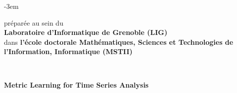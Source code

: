 \begin{titlepage}
\begin{adjustwidth}{}{-3em}
\begin{flushleft}
\vfill

\begin{flushright}
\begin{minipage}{\leftshift}
\begin{flushleft}
{préparée au sein du \\\textbf{Laboratoire d'Informatique de Grenoble (LIG)}\\
dans \textbf{l'école doctorale Mathématiques, Sciences et Technologies de l'Information, Informatique (MSTII)}}
\end{flushleft}
\end{minipage}
\end{flushright}~~\\[0.5cm]

\vfill

\begin{flushright}
\begin{minipage}{\leftshift}
\begin{flushleft}
{ \Huge \bfseries Metric Learning for Time Series Analysis}
\end{flushleft}
\end{minipage}
\end{flushright}~~\\[0.6cm]
\vfill


\end{flushleft}
\end{adjustwidth}
\end{titlepage}

